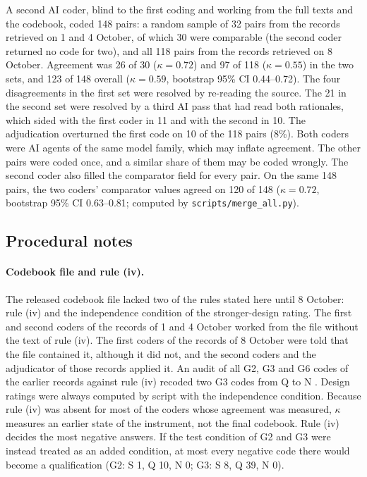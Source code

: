 A second AI coder, blind to the first coding and working from the full texts and the codebook, coded 148 pairs: a random sample of 32 pairs from the records retrieved on 1 and 4 October, of which 30 were comparable (the second coder returned no code for two), and all 118 pairs from the records retrieved on 8 October. Agreement was 26 of 30 ($\kappa = 0.72$) and 97 of 118 ($\kappa = 0.55$) in the two sets, and 123 of 148 overall ($\kappa = 0.59$, bootstrap 95\% CI 0.44--0.72). The four disagreements in the first set were resolved by re-reading the source. The 21 in the second set were resolved by a third AI pass that had read both rationales, which sided with the first coder in 11 and with the second in 10. The adjudication overturned the first code on 10 of the 118 pairs (8\%). Both coders were AI agents of the same model family, which may inflate agreement. The other pairs were coded once, and a similar share of them may be coded wrongly. The second coder also filled the comparator field for every pair. On the same 148 pairs, the two coders' comparator values agreed on 120 of 148 ($\kappa = 0.72$, bootstrap 95\% CI 0.63--0.81; computed by \nolinkurl{scripts/merge_all.py}).

\subsection{Procedural notes}\label{app:B6}

\paragraph{Codebook file and rule (iv).} The released codebook file lacked two of the rules stated here until 8 October: rule (iv) and the independence condition of the stronger-design rating. The first and second coders of the records of 1 and 4 October worked from the file without the text of rule (iv). The first coders of the records of 8 October were told that the file contained it, although it did not, and the second coders and the adjudicator of those records applied it. An audit of all G2, G3 and G6 codes of the earlier records against rule (iv) recoded two G3 codes from Q to N \cite{arx00831,arx35865}. Design ratings were always computed by script with the independence condition. Because rule (iv) was absent for most of the coders whose agreement was measured, $\kappa$ measures an earlier state of the instrument, not the final codebook. Rule (iv) decides the most negative answers. If the test condition of G2 and G3 were instead treated as an added condition, at most every negative code there would become a qualification (G2: S 1, Q 10, N 0; G3: S 8, Q 39, N 0).

